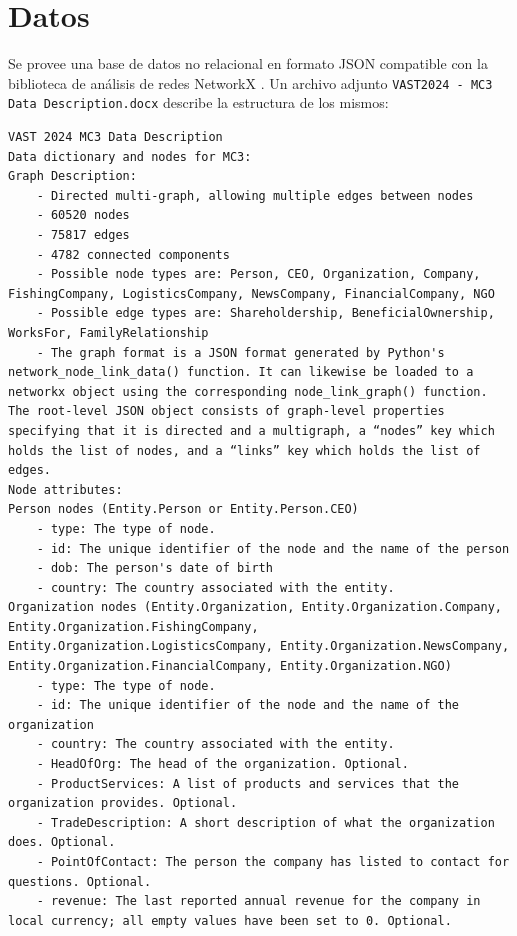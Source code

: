 \documentclass[11pt,spanish,a4paper]{article}
\begin{document}
\section{Datos}
Se provee una base de datos no relacional en formato JSON compatible con la biblioteca de análisis de redes NetworkX \cite{noauthor_networkx_nodate}.%
Un archivo adjunto \verb'VAST2024 - MC3 Data Description.docx' describe la estructura de los mismos:
\begin{verbatim}
VAST 2024 MC3 Data Description
Data dictionary and nodes for MC3:
Graph Description:
    - Directed multi-graph, allowing multiple edges between nodes
    - 60520 nodes
    - 75817 edges
    - 4782 connected components
    - Possible node types are: Person, CEO, Organization, Company, FishingCompany, LogisticsCompany, NewsCompany, FinancialCompany, NGO
    - Possible edge types are: Shareholdership, BeneficialOwnership, WorksFor, FamilyRelationship
    - The graph format is a JSON format generated by Python's network_node_link_data() function. It can likewise be loaded to a networkx object using the corresponding node_link_graph() function. The root-level JSON object consists of graph-level properties specifying that it is directed and a multigraph, a “nodes” key which holds the list of nodes, and a “links” key which holds the list of edges.
Node attributes:
Person nodes (Entity.Person or Entity.Person.CEO)
    - type: The type of node.
    - id: The unique identifier of the node and the name of the person
    - dob: The person's date of birth
    - country: The country associated with the entity. 
Organization nodes (Entity.Organization, Entity.Organization.Company, Entity.Organization.FishingCompany, Entity.Organization.LogisticsCompany, Entity.Organization.NewsCompany, Entity.Organization.FinancialCompany, Entity.Organization.NGO)
    - type: The type of node.
    - id: The unique identifier of the node and the name of the organization
    - country: The country associated with the entity.
    - HeadOfOrg: The head of the organization. Optional.
    - ProductServices: A list of products and services that the organization provides. Optional.
    - TradeDescription: A short description of what the organization does. Optional.
    - PointOfContact: The person the company has listed to contact for questions. Optional.
    - revenue: The last reported annual revenue for the company in local currency; all empty values have been set to 0. Optional.

\end{verbatim}
\end{document}
